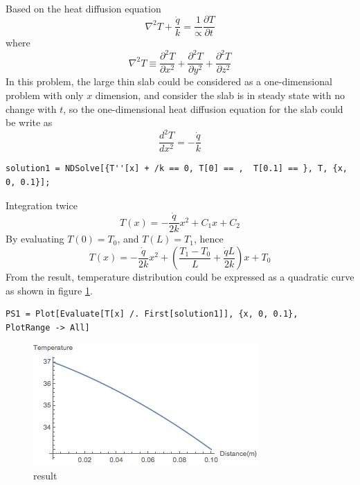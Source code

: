 \begin{solution}
~\\
Based on the heat diffusion equation 
$$\nabla^2 T+\frac{\dot{q}}{k}=\frac{1}{\propto}\frac{\partial T}{\partial t}$$
where
$$\nabla^2 T \equiv \frac{\partial^2 T}{\partial x^2}+
\frac{\partial^2 T}{\partial y^2}+
\frac{\partial^2 T}{\partial z^2}$$
In this problem, the large thin slab could be considered as a one-dimensional problem 
with only $x$ dimension, and consider the slab is in steady state with no change with $t$,
so the one-dimensional heat diffusion equation for the slab could be write as
$$\frac{d^2 T}{d x^2}=-\frac{\dot{q}}{k}$$
\begin{lstlisting}
solution1 = NDSolve[{T''[x] + /k == 0, T[0] == ,  T[0.1] == }, T, {x, 0, 0.1}];
\end{lstlisting}
Integration twice
$$T(x)=-\frac{\dot{q}}{2k}x^2+C_1x+C_2$$
By evaluating $T(0)=T_0$, and $T(L)=T_1$, hence
$$T(x)=-\frac{\dot{q}}{2k}x^2+ \left(\frac{T_1-T_0}{L}+\frac{\dot{q}L}{2k}\right)x+T_0$$
From the result, temperature distribution could be expressed as a quadratic curve as shown in
figure \ref{fig:2:7}.
\begin{lstlisting}
PS1 = Plot[Evaluate[T[x] /. First[solution1]], {x, 0, 0.1},    PlotRange -> All]
\end{lstlisting}
\begin{figure}[h!]
  \centering
    \includegraphics[scale=0.8]{figures/ch2/7}
    \caption{result}
    \label{fig:2:7}
\end{figure}
\end{solution}


